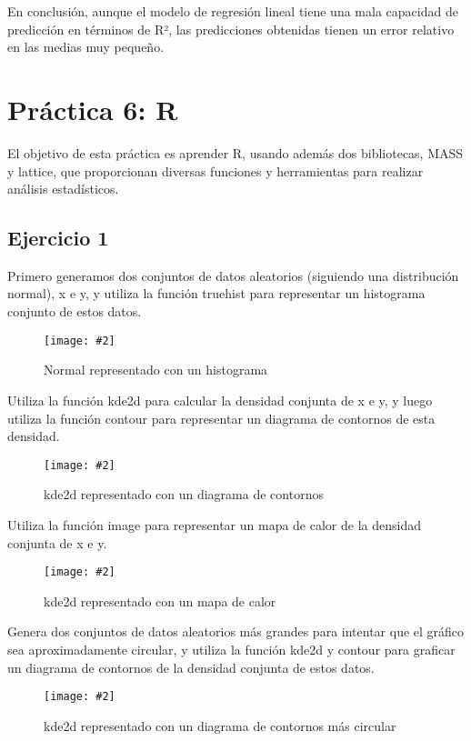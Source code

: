 \documentclass[
12pt, 
spanish, 
singlespacing,
headsepline
]{article}
\newcommand{\smallimage}[2]{
\begin{figure}[H]
	\caption{#1}
	\centering
	\texttt{[image: \#2]}
\end{figure}
}
\begin{document}
En conclusión, aunque el modelo de regresión lineal tiene una mala capacidad de predicción en términos de R², las predicciones obtenidas tienen un error relativo en las medias muy pequeño.


\section{Práctica 6: R}
El objetivo de esta práctica es aprender R, usando además dos bibliotecas, MASS y lattice, que proporcionan diversas funciones y herramientas para realizar análisis estadísticos.

\subsection{Ejercicio 1}
Primero generamos dos conjuntos de datos aleatorios (siguiendo una distribución normal), x e y, y utiliza la función truehist para representar un histograma conjunto de estos datos.

\smallimage{Normal representado con un histograma}{R/rnorm.png}


Utiliza la función kde2d para calcular la densidad conjunta de x e y, y luego utiliza la función contour para representar un diagrama de contornos de esta densidad.

\smallimage{kde2d representado con un diagrama de contornos}{R/contourkde2d.png}

Utiliza la función image para representar un mapa de calor de la densidad conjunta de x e y.

\smallimage{kde2d representado con un mapa de calor}{R/imagedd.png}

Genera dos conjuntos de datos aleatorios más grandes para intentar que el gráfico sea aproximadamente circular, y utiliza la función kde2d y contour para graficar un diagrama de contornos de la densidad conjunta de estos datos.

\smallimage{kde2d representado con un diagrama de contornos más circular}{R/contourkde2d-big.png}
\end{document}
